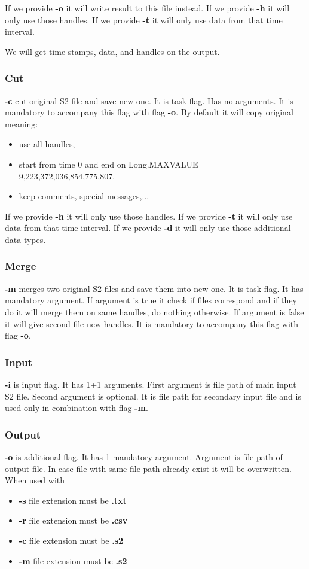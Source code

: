 \documentclass[english]{article}
\begin{document}
If we provide \textbf{-o} it will write result to this file instead.
If we provide \textbf{-h} it will only use those handles.
If we provide \textbf{-t} it will only use data from that time interval.

We will get time stamps, data, and handles on the output.

\subsubsection{Cut}
 \textbf{-c} cut original S2 file and save new one. It is task flag. Has no arguments. It is mandatory to accompany this flag with flag \textbf{-o}.
By default it will copy original meaning:
\begin{itemize}
\item use all handles,
\item start from time 0 and end on Long.MAXVALUE = 9,223,372,036,854,775,807.
\item keep comments, special messages,...
\end{itemize}

If we provide \textbf{-h} it will only use those handles.
If we provide \textbf{-t} it will only use data from that time interval.
If we provide \textbf{-d} it will only use those additional data types.

\subsubsection{Merge}
 \textbf{-m} merges two original S2 files and save them into new one. It is task flag. It has mandatory argument. If argument is true it check if files correspond and if they do it will merge them on same handles, do nothing otherwise. If argument is false it will give second file new handles. It is mandatory to accompany this flag with flag \textbf{-o}.


\subsubsection{Input}

 \textbf{-i} is input flag. It has 1+1 arguments. First argument is file path of main input S2 file. Second argument is optional. It is file path for secondary input file and is used only in combination with flag \textbf{-m}.

\subsubsection{Output}
\textbf{-o} is additional flag. It has 1 mandatory argument. Argument is file path of output file. In case file with same file path already exist it will be overwritten.
When used with
\begin{itemize}
\item \textbf{-s} file extension must be \textbf{.txt}
\item \textbf{-r} file extension must be \textbf{.csv}
\item \textbf{-c} file extension must be \textbf{.s2}
\item \textbf{-m} file extension must be \textbf{.s2}
\end{itemize}
\end{document}
